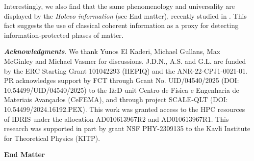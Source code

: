 \documentclass[aps,prl,twocolumn,superscriptaddress,numerical]{revtex4-2}
\renewcommand{\section}[1]{\textbf{\emph{#1}}.\!}
\begin{document}



Interestingly, we also find that the same phenomenology and universality are displayed by the \textit{Holevo information} (see End matter), recently studied in \cite{Zhuang2023_DynamicalPhaseTransitions_InformationFlow_RandomCircuits}. This fact suggests the use of classical coherent information as a proxy for detecting information-protected phases of matter.

\begin{acknowledgments}
\section{Acknowledgments} 
We thank Yunos El Kaderi, Michael Gullans, Max McGinley and Michael Vasmer
for discussions. J.D.N., A.S. and G.L. are funded by the ERC Starting Grant 101042293 (HEPIQ) and the ANR-22-CPJ1-0021-01. 
PR acknowledges support by FCT through Grant No. UID/04540/2025 (DOI: 10.54499/UID/04540/2025) to the I\&D unit Centro de Física e Engenharia de Materiais Avançados (CeFEMA), and through project SCALE-QLT (DOI: 10.54499/2024.16192.PEX).
This work was granted access to the HPC resources of IDRIS under the allocation AD010613967R2 and AD010613967R1. This research was supported in part by grant NSF PHY-2309135 to the Kavli Institute for Theoretical Physics (KITP). 
\end{acknowledgments}


\clearpage
\appendix 

\twocolumngrid
\begin{center}
    \textbf{\large End Matter}
\end{center}
\end{document}
